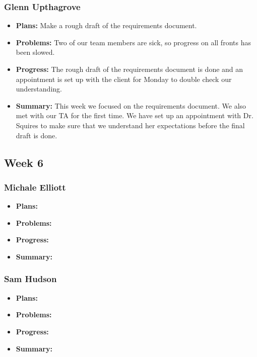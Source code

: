 \documentclass[onecolumn, draftclsnofoot,10pt, compsoc]{IEEEtran}
\begin{document}
\subsubsection{Glenn Upthagrove}
\begin {itemize}
 \item \textbf{Plans: }Make a rough draft of the requirements document.
 \item \textbf{Problems: }Two of our team members are sick, so progress on all fronts has been slowed.
 \item \textbf{Progress: }The rough draft of the requirements document is done and an appointment is set up with the client for Monday to double check our understanding. 
 \item \textbf{Summary: }This week we focused on the requirements document. We also met with our TA for the first time. We have set up an appointment with Dr. Squires to make sure that we understand her expectations before the final draft is done.  
\end {itemize}
\subsection {Week 6}
\subsubsection{Michale Elliott}
\begin {itemize}
 \item \textbf{Plans: }
 \item \textbf{Problems: }
 \item \textbf{Progress: }
 \item \textbf{Summary: }
\end {itemize}
\subsubsection{Sam Hudson}
\begin {itemize}
 \item \textbf{Plans: }
 \item \textbf{Problems: }
 \item \textbf{Progress: }
 \item \textbf{Summary: }
\end {itemize}
\end{document}
